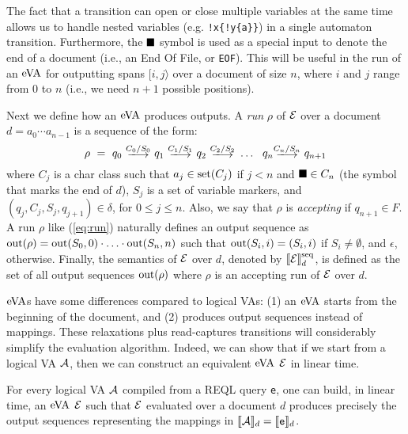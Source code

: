 
The fact that a transition can open or close multiple variables at the same time
allows us to handle nested variables (e.g. \texttt{!x\{!y\{a\}\}}) in a single
automaton transition. Furthermore, the $\blacksquare$ symbol is used as a special
input to denote the end of a document (i.e., an End Of File, or \texttt{EOF}).
This will be useful in the run of an $\mathrm{eVA}$ for outputting spans $[i, j\rangle$
over a document of size $n$, where $i$ and $j$ range from $0$ to $n$ (i.e., we
need $n+1$ possible positions).

Next we define how an $\mathrm{eVA}$ produces outputs. A \emph{run} $\rho$ of $\mathcal{E}$ over
a document $d = a_0 \cdots a_{n-1}$ is a sequence of the form:
\begin{equation}\label{eq:run}
	\rho \ = \ q_0 \ \longtrans{C_0 / S_0} \ q_1 \ \longtrans{C_1 / S_1} \ q_2 \ \longtrans{C_2 / S_2} \ \ldots \ \ q_{n} \longtrans{C_{n} / S_n} \ q_{n+1}
\end{equation}
where $C_j$ is a char class such that $a_j \in \operatorname{set}(C_j)$ if $j < n$ and
$\blacksquare \in C_n$ (the symbol that marks the end of $d$), $S_j$ is a set of
variable markers, and $(q_j,C_{j},S_{j}, q_{j+1}) \in \delta$, for $0\leq j\leq
n$. Also, we say that $\rho$ is \emph{accepting} if $q_{n+1} \in F$. A run
$\rho$ like (\ref{eq:run}) naturally defines an output sequence as $\operatorname{out}(\rho)
= \operatorname{out}(S_0, 0) \cdot \ldots \cdot \operatorname{out}(S_n, n)$ such that $\operatorname{out}(S_i, i) =
(S_i, i)$ if $S_i \neq \emptyset$, and $\epsilon$, otherwise. Finally, the
semantics of $\mathcal{E}$ over $d$, denoted by $\llbracket\mathcal{E}\rrbracket^{\operatorname{seq}}_d$, is defined as the set
of all output sequences $\operatorname{out}(\rho)$ where $\rho$ is an accepting run of $\mathcal{E}$
over $d$.

$\mathrm{eVA}$s have some differences compared to logical VAs: (1) an $\mathrm{eVA}$ starts from
the beginning of the document, and (2) produces output sequences instead of
mappings. These relaxations plus read-captures transitions will considerably
simplify the evaluation algorithm.  Indeed, we can show that if we start from a
logical VA $\mathcal{A}$, then we can construct an equivalent $\mathrm{eVA}$ $\mathcal{E}$ in linear
time. %
\begin{proposition}\label{prop:eVAconstruction} For every logical VA $\mathcal{A}$
	compiled from a REQL query \texttt{e}, one can build, in linear time, an
	$\mathrm{eVA}$ $\mathcal{E}$ such that $\mathcal{E}$ evaluated over a document $d$ produces
	precisely the output sequences representing the mappings in $\llbracket\mathcal{A}\rrbracket_d =
	\llbracket\texttt{e}\rrbracket_d$.
\end{proposition}


